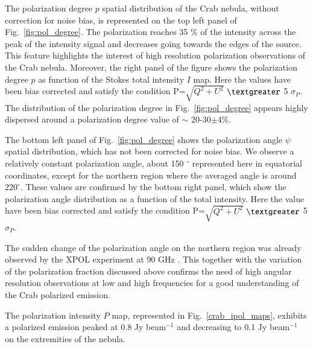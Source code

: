 \documentclass[twocolumn,traditabstract]{aa}
\begin{document}
The polarization degree $p$ spatial distribution of the Crab nebula, without correction for noise bias, is represented on the top left panel of Fig.~\ref{fig:pol_degree}. The polarization reaches 35 \% of the intensity across the peak of the intensity signal  and decreases going towards the edges of the source. 
This feature highlights the interest of high resolution polarization observations of the Crab nebula. Moreover, the right panel of the figure shows the polarization degree $p$ as function of the Stokes total intensity $I$ map. Here the values have been bias corrected and satisfy the condition P=$\sqrt{Q^2+U^2}$ $\textgreater$ 5 $\sigma_P$. The distribution of the polarization degree in Fig.~\ref{fig:pol_degree} appears highly dispersed around a polarization degree value of $\sim$ 20-30$\pm$4\%.

The bottom left panel of Fig.~\ref{fig:pol_degree} shows  the polarization angle $\psi$ spatial distribution, which has not been corrected for noise bias. 
We observe a relatively constant polarization angle, about 150 $^{\circ}$ represented here in equatorial coordinates, except for the northern region where the averaged angle is around $220^{\circ}$. 
These values are confirmed by the bottom right panel, which show the polarization angle distribution as a function of the total intensity. Here the value have been bias corrected and satisfy the condition P=$\sqrt{Q^2+U^2}$  $\textgreater$ 5 $\sigma_P$.

The sudden change of the polarization angle on the northern region was already observed by the XPOL experiment at 90 GHz \citep{aumont2010}.
This together with the variation of the polarization fraction discussed above confirms the need of high angular resolution observations at low and high frequencies for a good understanding of the Crab polarized emission.

The polarization intensity $P$ map, represented in Fig.~\ref{crab_ipol_maps}, exhibits a polarized emission peaked at 0.8 Jy beam$^{-1}$ and decreasing to 0.1 Jy beam$^{-1}$ on the extremities of the nebula. 
\end{document}
